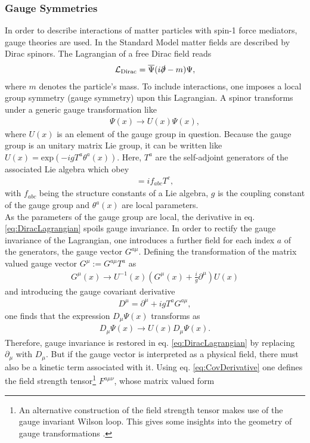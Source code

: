 \subsubsection*{Gauge Symmetries} 
In order to describe interactions of matter particles with spin-1 force mediators, gauge theories are used. In the Standard Model matter fields are described by Dirac spinors. The Lagrangian of a free Dirac field reads
\begin{align}
\mathcal{L}_{\mathrm{Dirac}} = \overline{\Psi} ( i\slashed{\partial} - m)\Psi,\label{eq:DiracLagrangian}
\end{align}
where $m$ denotes the particle's mass. To include interactions, one imposes a local group symmetry (gauge symmetry) upon this Lagrangian. A spinor transforms under a generic gauge transformation like 
\begin{align}
\Psi(x) \to U(x)\Psi(x),
\end{align}
where $U(x)$ is an element of the gauge group in question. Because the gauge group is an unitary matrix Lie group, it can be written like $U(x)=\mathrm{exp}(-igT^a\theta^a(x))$. Here, $T^a$ are the self-adjoint generators of the associated Lie algebra which obey
\begin{align}
[T^a,T^b] = if_{abc}T^c,
\end{align}
with $f_{abc}$ being the structure constants of a Lie algebra, $g$ is the coupling constant of the gauge group and $\theta^a(x)$ are local parameters.\\
As the parameters of the gauge group are local, the derivative in eq. \eqref{eq:DiracLagrangian} spoils gauge invariance. In order to rectify the gauge invariance of the Lagrangian, one introduces a further field for each index $a$ of the generators, the gauge vector $G^{a\mu}$. Defining the transformation of the matrix valued gauge vector $G^\mu := G^{a\mu}T^a$ as 
\begin{align}
G^{\mu}(x) \to U^{-1}(x) \left( G^\mu(x) + \frac{i}{g}\partial^\mu \right) U(x)
\end{align}
and introducing the gauge covariant derivative
\begin{align}
D^\mu = \partial^\mu + igT^aG^{a\mu},
\end{align}
one finds that the expression $D_\mu \Psi(x)$ transforms as
\begin{align}
D_\mu \Psi(x) \to U(x) D_\mu \Psi(x). \label{eq:CovDerivative}
\end{align}
Therefore, gauge invariance is restored in eq. \eqref{eq:DiracLagrangian} by replacing $\partial_\mu$ with $D_\mu$. But if the gauge vector is interpreted as a physical field, there must   also be a kinetic term associated with it. Using eq. \eqref{eq:CovDerivative} one defines the field strength tensor\footnote{An alternative construction of the field strength tensor makes use of the gauge invariant Wilson loop. This gives some insights into the geometry of gauge transformations \cite{Peskin}.} $F^{a\mu\nu}$, whose matrix valued form
